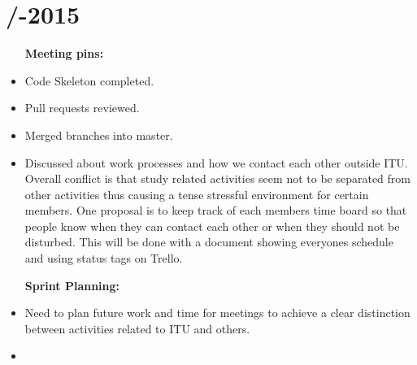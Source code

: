 \section{\logtitle /-2015} %
\attend{\at}{\nat}{\at}{\at}


\begin{itemize}
	\item [\textbf{Meeting pins:}]
	\item Code Skeleton completed.
	\item Pull requests reviewed.
    \item Merged branches into master.
    \item Discussed about work processes and how we contact each other outside ITU. Overall conflict is that study related activities seem not to be separated from other activities thus causing a tense stressful environment for certain members. One proposal is to keep track of each members time board  so that people know when they can contact each other or when they should not be disturbed. This will be done with a document showing everyones schedule and using status tags on Trello. 
\end{itemize}

\begin{itemize}
	\item [\textbf{Sprint Planning:}]
	\item Need to plan future work and time for meetings to achieve a clear distinction between activities related to ITU and others. 
	\item 
\end{itemize}